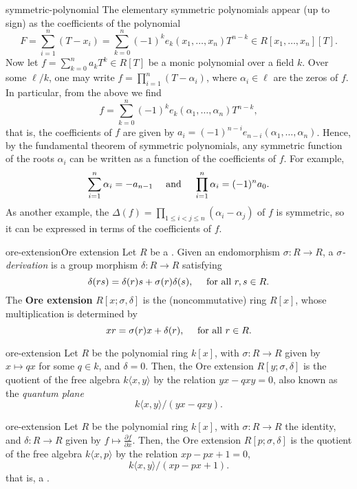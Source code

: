 \begin{example}{symmetric-polynomial}
    The elementary symmetric polynomials appear (up to sign) as the coefficients of the polynomial
    \[ F = \sum_{i = 1}^{n} (T - x_i) = \sum_{k = 0}^{n} (-1)^k e_k (x_1, \ldots, x_n) T^{n - k} \in R[x_1, \ldots, x_n][T]  .\]
    Now let $f = \sum_{k = 0}^{n} a_k T^k \in R[T]$ be a monic polynomial over a field $k$. Over some  $\ell/k$, one may write $f = \prod_{i = 1}^{n} (T - \alpha_i)$, where $\alpha_i \in \ell$ are the zeros of $f$. In particular, from the above we find
    \[ f = \sum_{k = 0}^{n} (-1)^k e_k(\alpha_1, \ldots, \alpha_n) T^{n - k} , \]
    that is, the coefficients of $f$ are given by $a_i = (-1)^{n - i} e_{n - i}(\alpha_1, \ldots, \alpha_n)$. Hence, by the fundamental theorem of symmetric polynomials, any symmetric function of the roots $\alpha_i$ can be written as a function of the coefficients of $f$. For example,
    \[ \sum_{i = 1}^{n} \alpha_i = - a_{n - 1} \quad \textup{ and } \quad \prod_{i = 1}^{n} \alpha_i = (-1)^n a_0 . \]
    As another example, the  $\Delta(f) = \prod_{1 \le i < j \le n} (\alpha_i - \alpha_j)$ of $f$ is symmetric, so it can be expressed in terms of the coefficients of $f$.
\end{example}

\begin{topic}{ore-extension}{Ore extension}
    Let $R$ be a . Given an endomorphism $\sigma : R \to R$, a \textit{$\sigma$-derivation} is a group morphism $\delta : R \to R$ satisfying
    \[ \delta(rs) = \delta(r) s + \sigma(r) \delta(s) , \quad \textup { for all } r, s \in R . \]
    The \textbf{Ore extension} $R[x; \sigma, \delta]$ is the (noncommutative) ring $R[x]$, whose multiplication is determined by
    \[ xr = \sigma(r) x + \delta(r), \quad \textup{ for all } r \in R . \]
\end{topic}

\begin{example}{ore-extension}
    Let $R$ be the polynomial ring $k[x]$, with $\sigma : R \to R$ given by $x \mapsto qx$ for some $q \in k$, and $\delta = 0$. Then, the Ore extension $R[y; \sigma, \delta]$ is the quotient of the free algebra $k \langle x, y \rangle$ by the relation $yx - qxy = 0$, also known as the \textit{quantum plane}
    \[ k \langle x, y \rangle / (yx - qxy) . \]
\end{example}

\begin{example}{ore-extension}
    Let $R$ be the polynomial ring $k[x]$, with $\sigma : R \to R$ the identity, and $\delta : R \to R$ given by $f \mapsto \frac{\partial f}{\partial x}$. Then, the Ore extension $R[p; \sigma, \delta]$ is the quotient of the free algebra $k \langle x, p \rangle$ by the relation $xp - px + 1 = 0$,
    \[ k \langle x, y \rangle / (xp - px + 1) . \]
    that is, a .
\end{example}

